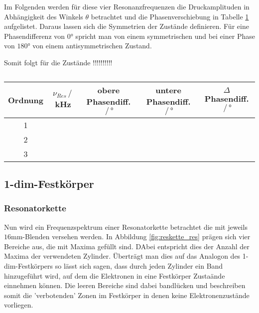 Im Folgenden werden für diese vier Resonanzfrequenzen die Druckamplituden in Abhängigkeit des Winkels $\theta$ betrachtet und die Phasenverschiebung in Tabelle \ref{tab:mol_diff} aufgelistet.
Daraus lassen sich die Symmetrien der Zustände definieren. Für eine Phasendifferenz von $0°$ spricht man von einem symmetrischen und bei einer Phase von $180°$ von einem antisymmetrischen Zustand.
\begin{figure}[H]
    \centering
    \hfil
    \hfil 
    
    \hfil
    \hfil 
    \caption{}
    \label{fig:polarplots}
\end{figure}
Somit folgt für die Zustände !!!!!!!!!!

\begin{table}
    \center
    \caption{}
    \begin{tabular}{c| c c c c}
        \toprule
        Ordnung & $\nu_{Res}\,/\,$kHz & obere Phasendiff. $\,/\,°$ & untere Phasendiff. $\,/\,°$ & $\Delta$ Phasendiff. $\,/\,°$\\
        \midrule
        1 & & & & \\
        2 & & & & \\
        3 & & & & \\
        \bottomrule
    \end{tabular}
    \label{tab:mol_diff}
\end{table}

\subsection{1-dim-Festkörper}
\subsubsection*{Resonatorkette}
Nun wird ein Frequenzspektrum einer Resonatorkette betrachtet die mit jeweils $16$mm-Blenden versehen werden.
In Abbildung \ref{fig:reskette_res} prägen sich vier Bereiche aus, die mit Maxima gefüllt sind. DAbei entspricht dies der Anzahl der Maxima der verwendeten Zylinder.
Überträgt man dies auf das Analogon des 1-dim-Festkörpers so lässt sich sagen, dass durch jeden Zylinder ein Band hinzugeführt wird, auf dem die Elektronen
in eine Festkörper Zustaände einnehmen können. Die leeren Bereiche sind dabei bandlücken und beschreiben somit die 'verbotenden' Zonen im Festkörper in denen keine Elektronenzustände vorliegen.


